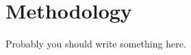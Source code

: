 \graphicspath{{./methodology/}}

\chapter{Methodology}
\label{sec:Methodology}

Probably you should write something here.
